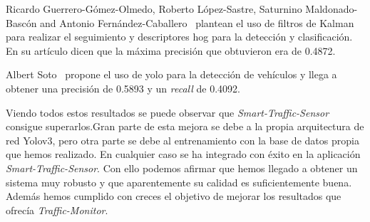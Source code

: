 Ricardo Guerrero-Gómez-Olmedo, Roberto López-Sastre, Saturnino Maldonado-Bascón and Antonio Fernández-Caballero~\cite{gram-tracking} plantean el uso de filtros de Kalman para realizar el seguimiento y descriptores \acrshort{hog} para la detección y clasificación. En su artículo dicen que la máxima precisión que obtuvieron era de 0.4872.

Albert Soto~\cite{albert_soto} propone el uso de \acrshort{yolo} para la detección de vehículos y llega a obtener una precisión de 0.5893 y un  \textit{recall} de 0.4092.


Viendo todos estos resultados se puede observar que \textit{Smart-Traffic-Sensor} consigue superarlos.Gran parte de esta mejora se debe a la propia arquitectura de red Yolov3, pero otra parte se debe al entrenamiento con la base de datos propia que hemos realizado. En cualquier caso se ha integrado con éxito en la aplicación \textit{Smart-Traffic-Sensor}. Con ello podemos afirmar que hemos llegado a obtener un sistema muy robusto y que aparentemente su calidad es suficientemente buena. Además hemos cumplido con creces el objetivo de mejorar los resultados que ofrecía \textit{Traffic-Monitor}. 